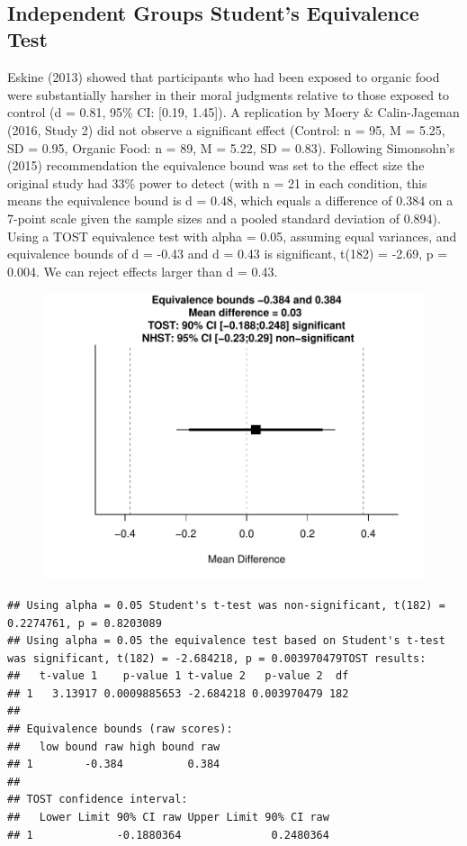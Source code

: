 \documentclass[english,man]{apa6}
\theoremstyle{definition}
\theoremstyle{definition}
\theoremstyle{definition}
\theoremstyle{remark}
\begin{document}
~

\subsection{Independent Groups Student's Equivalence
Test}\label{independent-groups-students-equivalence-test}

Eskine (2013) showed that participants who had been exposed to organic
food were substantially harsher in their moral judgments relative to
those exposed to control (d = 0.81, 95\% CI: {[}0.19, 1.45{]}). A
replication by Moery \& Calin-Jageman (2016, Study 2) did not observe a
significant effect (Control: n = 95, M = 5.25, SD = 0.95, Organic Food:
n = 89, M = 5.22, SD = 0.83). Following Simonsohn's (2015)
recommendation the equivalence bound was set to the effect size the
original study had 33\% power to detect (with n = 21 in each condition,
this means the equivalence bound is d = 0.48, which equals a difference
of 0.384 on a 7-point scale given the sample sizes and a pooled standard
deviation of 0.894). Using a TOST equivalence test with alpha = 0.05,
assuming equal variances, and equivalence bounds of d = -0.43 and d =
0.43 is significant, t(182) = -2.69, p = 0.004. We can reject effects
larger than d = 0.43.

\begin{figure}[htbp]
\centering
\includegraphics{manuscript_files/figure-latex/unnamed-chunk-6-1.pdf}
\caption{}
\end{figure}

\begin{verbatim}
## Using alpha = 0.05 Student's t-test was non-significant, t(182) = 0.2274761, p = 0.8203089
## Using alpha = 0.05 the equivalence test based on Student's t-test was significant, t(182) = -2.684218, p = 0.003970479TOST results:
##   t-value 1    p-value 1 t-value 2   p-value 2  df
## 1   3.13917 0.0009885653 -2.684218 0.003970479 182
## 
## Equivalence bounds (raw scores):
##   low bound raw high bound raw
## 1        -0.384          0.384
## 
## TOST confidence interval:
##   Lower Limit 90% CI raw Upper Limit 90% CI raw
## 1             -0.1880364              0.2480364
\end{verbatim}
\end{document}
